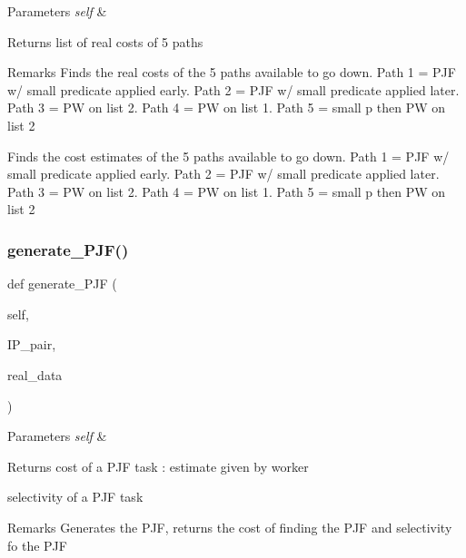 \begin{DoxyParams}{Parameters}
{\em self} & \\
\hline
\end{DoxyParams}
\begin{DoxyReturn}{Returns}
list of real costs of 5 paths 
\end{DoxyReturn}
\begin{DoxyRemark}{Remarks}
Finds the real costs of the 5 paths available to go down. Path 1 = P\+JF w/ small predicate applied early. Path 2 = P\+JF w/ small predicate applied later. Path 3 = PW on list 2. Path 4 = PW on list 1. Path 5 = small p then PW on list 2\begin{DoxyVerb}Finds the cost estimates of the 5 paths available to go down. Path 1 = PJF w/ small predicate applied early. 
Path 2 = PJF w/ small predicate applied later. Path 3 = PW on list 2. Path 4 = PW on list 1. Path 5 = small p then PW on list 2\end{DoxyVerb}
 
\end{DoxyRemark}
\mbox{\label{classdynamicfilterapp_1_1models_1_1_join_a5392742a9380d1854a4857c33423aaf8}} 
\subsubsection{\texorpdfstring{generate\+\_\+\+P\+J\+F()}{generate\_PJF()}}
{\footnotesize\ttfamily def generate\+\_\+\+P\+JF (\begin{DoxyParamCaption}\item[{}]{self,  }\item[{}]{I\+P\+\_\+pair,  }\item[{}]{real\+\_\+data }\end{DoxyParamCaption})}


\begin{DoxyParams}{Parameters}
{\em self} & \\
\hline
\end{DoxyParams}
\begin{DoxyReturn}{Returns}
cost of a P\+JF task \+: estimate given by worker 

selectivity of a P\+JF task 
\end{DoxyReturn}
\begin{DoxyRemark}{Remarks}
Generates the P\+JF, returns the cost of finding the P\+JF and selectivity fo the P\+JF 
\end{DoxyRemark}
\mbox{\label{classdynamicfilterapp_1_1models_1_1_join_a22edc19c031e9b7b51a7c9eab7ba81c1}} 
